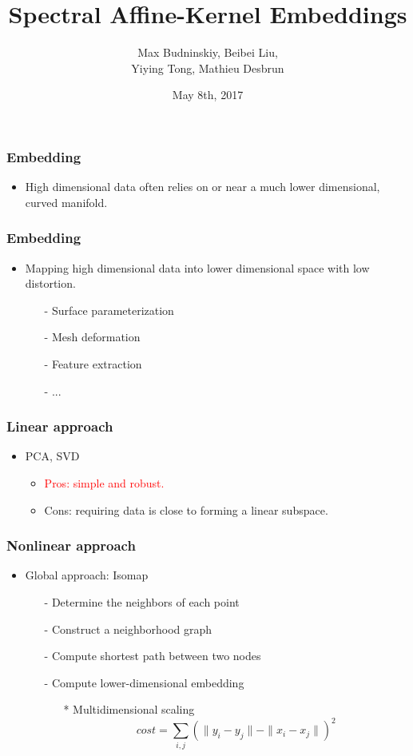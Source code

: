 \documentclass[serif,mathserif, 12pt]{beamer}
\title[\hspace{2em}\insertframenumber/\inserttotalframenumber]{Spectral Affine-Kernel Embeddings}
\date{May 8th, 2017}
\author{Max Budninskiy, Beibei Liu,\\ Yiying Tong, Mathieu Desbrun}
\begin{document}
\maketitle

\begin{frame}
  \frametitle{Embedding}
  \begin{itemize}
  \item High dimensional data often relies on or near a much
    lower dimensional, curved manifold.
  \end{itemize}
\end{frame}

\begin{frame}
  \frametitle{Embedding}
  \begin{itemize}
  \item Mapping high dimensional data into lower dimensional space with
    low distortion.
    \begin{itemize}
    \item[-] Surface parameterization
    \item[-] Mesh deformation
    \item[-] Feature extraction
    \item[-] ...
    \end{itemize}
  \end{itemize}
\end{frame}

\begin{frame}
  \frametitle{Linear approach}
  \begin{itemize}
  \item PCA, SVD
    \begin{itemize}
    \item \textcolor{red}{Pros: simple and robust.}
    \item \textcolor{green!50!black}{Cons: requiring data is close to forming a linear subspace.}
    \end{itemize}
  \end{itemize}
\end{frame}

\begin{frame}
  \frametitle{Nonlinear approach}
  \begin{itemize}
  \item Global approach: Isomap
    \begin{itemize}
    \item[-] Determine the neighbors of each point
    \item[-] Construct a neighborhood graph
    \item[-] Compute shortest path between two nodes
    \item[-] Compute lower-dimensional embedding
      \begin{itemize}
      \item[*] Multidimensional scaling
        \begin{equation*}
          cost = \sum_{i, j} (\|y_i-y_j\|-\|x_i-x_j\|)^2
        \end{equation*}
      \end{itemize}
    \end{itemize}
  \end{itemize}
\end{frame}
\end{document}
